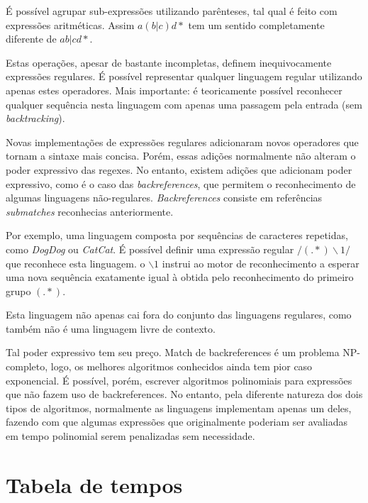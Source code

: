 \documentclass[a4paper,12pt,oneside,onecolumn]{uerj}
\begin{document}
É possível agrupar sub-expressões utilizando parênteses, tal qual é feito com expressões aritméticas. Assim $a(b|c)d*$ tem um sentido completamente diferente de $ab|cd*$.

Estas operações, apesar de bastante incompletas, definem inequivocamente expressões regulares. É possível representar qualquer linguagem regular utilizando apenas estes operadores. Mais importante: é teoricamente possível reconhecer qualquer sequência nesta linguagem com apenas uma passagem pela entrada (sem \emph{backtracking}). 

Novas implementações de expressões regulares adicionaram novos operadores que tornam a sintaxe mais concisa. Porém, essas adições normalmente não alteram o poder expressivo das regexes. No entanto, existem adições que adicionam poder expressivo, como é o caso das \emph{backreferences}, que permitem o reconhecimento de algumas linguagens não-regulares. \emph{Backreferences} consiste em referências \emph{submatches} reconhecias anteriormente.

Por exemplo, uma linguagem composta por sequências de caracteres repetidas, como \emph{DogDog} ou \emph{CatCat}. É possível definir uma expressão regular $/(.*)\backslash 1/$ que reconhece esta linguagem. o $\backslash 1$ instrui ao motor de reconhecimento a esperar uma nova sequência exatamente igual à obtida pelo reconhecimento do primeiro grupo $(.*)$.

Esta linguagem não apenas cai fora do conjunto das linguagens regulares, como também não é uma linguagem livre de contexto.

Tal poder expressivo tem seu preço. Match de backreferences é um problema NP-completo, logo, os melhores algoritmos conhecidos ainda tem pior caso exponencial. É possível, porém, escrever algoritmos polinomiais para expressões que não fazem uso de backreferences. No entanto, pela diferente natureza dos dois tipos de algoritmos, normalmente as linguagens implementam apenas um deles, fazendo com que algumas expressões que originalmente poderiam ser avaliadas em tempo polinomial serem penalizadas sem necessidade.

\backmatter

\appendix


\section{Tabela de tempos}
\end{document}

